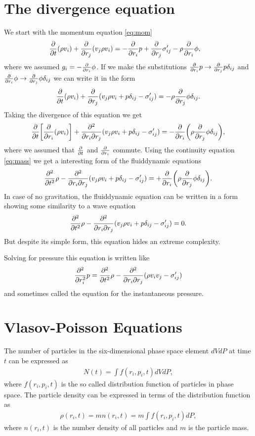 \chapter{The divergence equation}\label{diveq}
We start with the momentum equation \eqref{eq:mom}
\begin{align*}
\frac{\partial}{\partial t}(\rho v_i) + \frac{\partial}{\partial r_j}(v_j \rho v_i) &= -\frac{\partial}{\partial r_i}p + \frac{\partial}{\partial r_j}\sigma'_{ij}
-\rho \frac{\partial}{\partial r_i} \phi,
\end{align*}
where we assumed $g_i=-\frac{\partial}{\partial r_i} \phi$. If we make the substitutions 
$\frac{\partial}{\partial r_i} p \rightarrow \frac{\partial}{\partial r_j} p \delta_{ij}$ and 
$\frac{\partial}{\partial r_i} \phi \rightarrow \frac{\partial}{\partial r_j} \phi \delta_{ij}$ we can write it in the 
form
\begin{align*}
\frac{\partial}{\partial t}(\rho v_i) + \frac{\partial}{\partial r_j}(v_j \rho v_i + p \delta_{ij} - \sigma'_{ij}) 
= -\rho \frac{\partial}{\partial r_j} \phi \delta_{ij}.
\end{align*}
Taking the divergence of this equation we get
\begin{align*}
\frac{\partial}{\partial t}{ \left[ \frac{\partial}{\partial r_i} (\rho v_i) \right] } 
+ \frac{\partial^2}{\partial r_i \partial r_j}(v_j \rho v_i + p \delta_{ij} -
\sigma'_{ij}) 
= -\frac{\partial}{\partial r_i}{ \left( \rho \frac{\partial}{\partial r_j} \phi \delta_{ij} \right) },
\end{align*}
where we assumed that $\frac{\partial}{\partial t}$ and $\frac{\partial}{\partial r_i}$ commute. Using the continuity 
equation \eqref{eq:mass} we get a interesting form of the fluiddynamic 
equations
\begin{align}
\frac{\partial^2}{\partial t^2}\rho 
- \frac{\partial^2}{\partial r_i \partial r_j}(v_j \rho v_i + p \delta_{ij} -
\sigma'_{ij}) 
= +\frac{\partial}{\partial r_i}{ \left( \rho \frac{\partial}{\partial r_j} \phi \delta_{ij} \right) }.\label{eq:divbeauty}
\end{align}
In case of no gravitation, the fluiddynamic equation can be written in a form
showing some similarity to a wave equation
\begin{align*}
\frac{\partial^2}{\partial t^2}\rho 
- \frac{\partial^2}{\partial r_i \partial r_j}(v_j \rho v_i + p \delta_{ij} -
\sigma'_{ij}) 
= 0.
\end{align*}
But despite its simple form, this equation hides an extreme complexity.

Solving for pressure this equation is written like
\begin{align}
\frac{\partial^2}{\partial r_i^2} p = \frac{\partial^2}{\partial t^2}\rho- 
\frac{\partial^2}{\partial r_i \partial r_j}(\rho v_i
v_j-\sigma'_{ij})
\end{align}
and sometimes called the equation for the instantaneous pressure.

\chapter{Vlasov-Poisson Equations}\label{vlaspois}
The number of particles in the six-dimensional phase space element $dV dP$
at time $t$ can be expressed as
\begin{align}
N(t) = \int f(r_i,p_i,t) dV dP,
\end{align}
where $f(r_i,p_i,t)$ is the so called distribution function of particles in
phase space. The particle density can be expressed in terms of the distribution
function as
\begin{align}
\rho(r_i,t)=m n(r_i,t) = m \int f(r_i,p_i,t) dP,
\end{align}
where $n(r_i,t)$ is the number density of all particles and $m$ is the
particle mass. 

